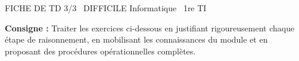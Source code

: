 \documentclass[11pt]{article}
\begin{document}
\begin{tcolorbox}[enhanced,colback=popink,colframe=popink,arc=10pt,boxrule=0pt,left=12pt,right=12pt,top=9pt,bottom=9pt]
{\color{white}\popxbold\small FICHE DE TD 3/3 \textbullet\ DIFFICILE \hfill Informatique \textbullet\ 1re TI\par}
\end{tcolorbox}
\vspace{4pt}
\noindent \textbf{Consigne :} Traiter les exercices ci-dessous en justifiant rigoureusement chaque étape de raisonnement, en mobilisant les connaissances du module et en proposant des procédures opérationnelles complètes.
\end{document}
